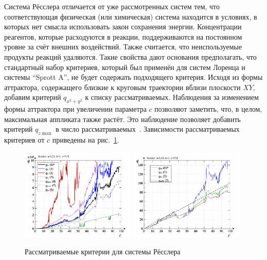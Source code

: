 Система Рёсслера отличается от уже рассмотренных систем тем,
что соответствующая физическая (или химическая) система
находится в условиях, в которых нет смысла использовать
закон сохранения энергии. Концентрации реагентов,
которые расходуются в реакции, поддерживаются на постоянном уровне
за счёт внешних воздействий. Также считается,
что неиспользуемые продукты реакций удаляются.
Такие свойства дают основания предполагать,
что стандартный набор критериев, который был применён для
систем Лоренца и системы ``Sprott A'', не будет
содержать подходящего критерия. Исходя из формы аттрактора,
содержащего близкие к круговым траектории вблизи плоскости $XY$,
добавим критерий $q_{x^2+y^2}$ к списку рассматриваемых.
Наблюдения за изменением формы аттрактора при увеличении параметра $c$
позволяют заметить, что, в целом, максимальная аппликата также
растёт. Это наблюдение позволяет добавить критерий $q_{z \max{}}$
в число рассматриваемых~\cite{atu_ISDMCI2012,atu_asau14}.
Зависимости рассматриваемых критериев от $c$
приведены на рис.~\ref{atu:f:ross_q}.



\begin{figure}[ht!]
\begin{center}
  \includegraphics[width=0.49\textwidth]{p/cha/ross/ross_q-p_q.png}
  \hfill
  \includegraphics[width=0.49\textwidth]{p/cha/ross/ross_q-p_q1.png}
\end{center}
  \caption{Рассматриваемые критерии для системы Рёсслера}
\label{atu:f:ross_q}
\end{figure}

